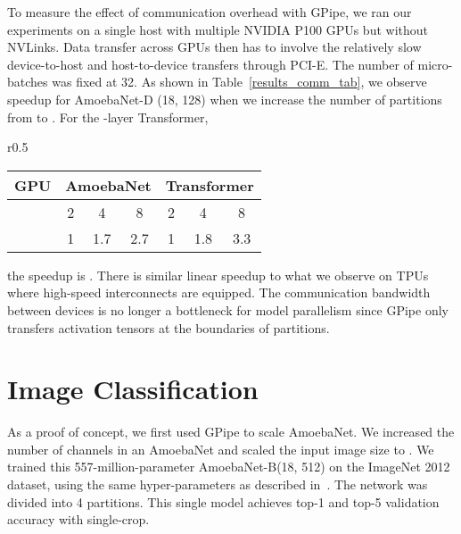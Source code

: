 \documentclass{article}
\def\codename{GPipe}
\begin{document}
To measure the effect of communication overhead with \codename{}, we ran our experiments on a single host with multiple NVIDIA P100 GPUs but without NVLinks. Data transfer across GPUs then has to involve the relatively slow device-to-host and host-to-device transfers through PCI-E. The number of micro-batches was fixed at 32. As shown in Table~\ref{results_comm_tab}, we observe  speedup for AmoebaNet-D (18, 128) when we increase the number of partitions from  to . For the -layer Transformer,
\begin{wraptable}{r}{0.5\textwidth}
\begin{small}
\begin{center}
\caption{Normalized training throughput using \codename{} on GPUs without high-speed interconnect.}
\label{results_comm_tab}
\begin{tabular}{rcccccc}
\toprule
GPU & \multicolumn{3}{c}{AmoebaNet} & \multicolumn{3}{c}{Transformer}  \\
 \midrule
  & 2 & 4 & 8 & 2 & 4 & 8\\\hline
  & 1 & 1.7 & 2.7 &  1 & 1.8 & 3.3 \\
\bottomrule
\end{tabular}
\end{center}
\end{small}
\end{wraptable}
the speedup is . There is similar linear speedup to what we observe on TPUs where high-speed interconnects are equipped. The communication bandwidth between devices is no longer a bottleneck for model parallelism since \codename{} only transfers activation tensors at the boundaries of partitions. 


\section{Image Classification}
\label{section:imagenet_results}
As a proof of concept, we first used \codename{} to scale AmoebaNet. We increased the number of channels in an AmoebaNet and scaled the input image size to . We trained this 557-million-parameter AmoebaNet-B(18, 512) on the ImageNet 2012 dataset, using the same hyper-parameters as described in~\cite{real2018regularized}. The network was divided into 4 partitions. This single model achieves  top-1 and  top-5 validation accuracy with single-crop.
\end{document}
